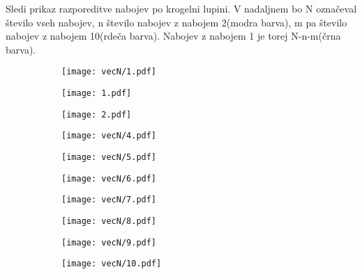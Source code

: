 \documentclass{article}
\begin{document}
Sledi prikaz razporeditve nabojev po krogelni lupini. V nadaljnem bo N označeval število vseh nabojev, n število nabojev z nabojem 2(modra barva), m pa število nabojev z nabojem 10(rdeča barva). Nabojev z nabojem 1 je torej N-n-m(črna barva). 
\begin{figure}[H]
\centering
\begin{subfigure}{.49\linewidth}
\texttt{[image: vecN/1.pdf]}
\end{subfigure}
\begin{subfigure}{.49\linewidth}
\texttt{[image: 1.pdf]}
\end{subfigure}
\end{figure}
\begin{figure}[H]
\centering
\begin{subfigure}{.49\textwidth}
\texttt{[image: 2.pdf]}
\end{subfigure}
\begin{subfigure}{.49\textwidth}
\texttt{[image: vecN/4.pdf]}
\end{subfigure}
\end{figure}
\begin{figure}[H]
\centering
\begin{subfigure}{.49\textwidth}
\texttt{[image: vecN/5.pdf]}
\end{subfigure}
\begin{subfigure}{.49\textwidth}
\texttt{[image: vecN/6.pdf]}
\end{subfigure}
\end{figure}
\begin{figure}[H]
\centering
\begin{subfigure}{.49\textwidth}
\texttt{[image: vecN/7.pdf]}
\end{subfigure}
\begin{subfigure}{.49\textwidth}
\texttt{[image: vecN/8.pdf]}
\end{subfigure}
\end{figure}
\begin{figure}[H]
\centering
\begin{subfigure}{.49\textwidth}
\texttt{[image: vecN/9.pdf]}
\end{subfigure}
\begin{subfigure}{.49\textwidth}
\texttt{[image: vecN/10.pdf]}
\end{subfigure}
\end{figure}
\end{document}
